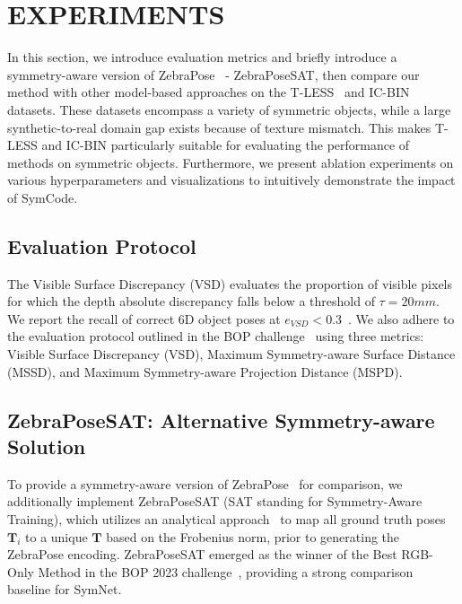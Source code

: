 \section{EXPERIMENTS}

In this section, we introduce evaluation metrics and briefly introduce a symmetry-aware version of ZebraPose~\cite{su2022zebrapose} - ZebraPoseSAT, then compare our method with other model-based approaches on the T-LESS~\cite{2017tless} and IC-BIN~\cite{icbin} datasets. These datasets encompass a variety of symmetric objects, while a large synthetic-to-real domain gap exists because of texture mismatch. This makes T-LESS and IC-BIN particularly suitable for evaluating the performance of methods on symmetric objects. Furthermore, we present ablation experiments on various hyperparameters and visualizations to intuitively demonstrate the impact of SymCode.

\subsection{Evaluation Protocol}

The Visible Surface Discrepancy (VSD) evaluates the proportion of visible pixels for which the depth absolute discrepancy falls below a threshold of $\tau=20mm$. We report the recall of correct 6D object poses at $e_{VSD}<0.3$~\cite{pitteri2019object}. We also adhere to the evaluation protocol outlined in the BOP challenge~\cite{hodan2024bop} using three metrics: Visible Surface Discrepancy (VSD), Maximum Symmetry-aware Surface Distance (MSSD), and Maximum Symmetry-aware Projection Distance (MSPD). 

\subsection{ZebraPoseSAT: Alternative Symmetry-aware Solution}
To provide a symmetry-aware version of ZebraPose~\cite{su2022zebrapose} for comparison, we additionally implement ZebraPoseSAT (SAT standing for Symmetry-Aware Training), which utilizes an analytical approach~\cite{pitteri2019object} to map all ground truth poses $\mathbf{T}_i$ to a unique $\mathbf{T}$ based on the Frobenius norm, prior to generating the ZebraPose encoding. 
ZebraPoseSAT emerged as the winner of the Best RGB-Only Method in the BOP 2023 challenge~\cite{hodan2024bop}, providing a strong comparison baseline for SymNet.


